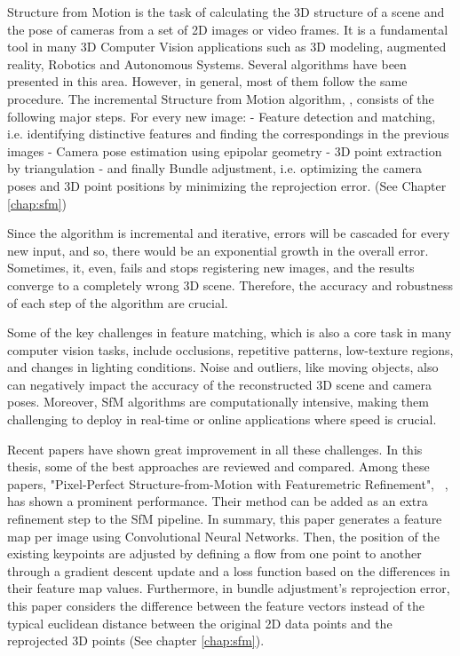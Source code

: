 \documentclass[11pt]{article}
\begin{document}
    Structure from Motion is the task of calculating the 3D structure of a scene and the pose of cameras from
    a set of 2D images or video frames.
    It is a fundamental tool in many 3D Computer Vision applications such as 3D modeling, augmented reality,
    Robotics and Autonomous Systems.
    Several algorithms have been presented in this area. However, in general, most of them follow the same procedure.
    The incremental Structure from Motion algorithm, \cite{schoenberger2016sfm}, consists of the following major steps.
    For every new image: - Feature detection and matching, i.e. identifying distinctive features and finding the
    correspondings in the previous images - Camera pose estimation using epipolar geometry - 3D point extraction
    by triangulation - and finally Bundle adjustment, i.e. optimizing the camera poses and 3D point positions by
    minimizing the reprojection error. (See Chapter \ref{chap:sfm})

    Since the algorithm is incremental and iterative, errors will be cascaded for every new input, and so, there would be
    an exponential growth in the overall error. Sometimes, it, even, fails and stops registering new images,
    and the results converge to a completely wrong 3D scene. Therefore, the accuracy and robustness of each step of the algorithm are crucial.

    Some of the key challenges in feature matching, which is also a core task in many computer vision tasks,
    include occlusions, repetitive patterns, low-texture regions, and changes in lighting conditions.
    Noise and outliers, like moving objects, also can negatively impact the accuracy
    of the reconstructed 3D scene and camera poses. Moreover, SfM algorithms are computationally intensive,
    making them challenging to deploy in real-time or online applications where speed is crucial.

    Recent papers have shown great improvement in all these challenges. In this thesis, some of the best approaches are
    reviewed and compared. Among these papers, "Pixel-Perfect Structure-from-Motion with Featuremetric Refinement",
    ~\cite{lindenberger2021pixsfm}, has shown a prominent performance. Their method can be added as an extra refinement
    step to the SfM pipeline. In summary, this paper generates
    a feature map per image using Convolutional Neural Networks. Then, the position of the existing keypoints are adjusted by defining a flow
    from one point to another through a gradient descent update and a loss function based on the differences in their
    feature map values.
    Furthermore, in bundle adjustment's reprojection error, this paper considers the difference between the
    feature vectors instead of the typical euclidean distance between the original 2D data points and the reprojected
    3D points (See chapter \ref{chap:sfm}).
\end{document}
